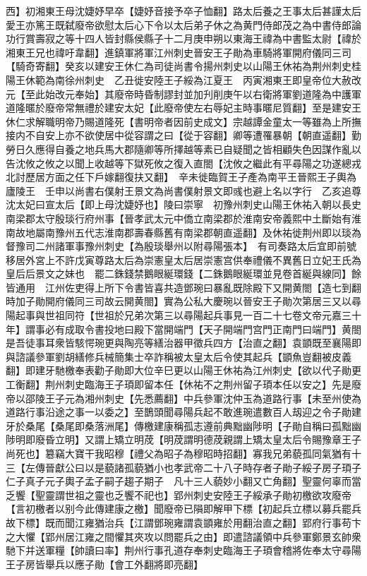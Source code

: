 西】初湘東王母沈婕妤早卒【婕妤音接予卒子恤翻】路太后養之王事太后甚謹太后愛王亦篤王既弑廢帝欲慰太后心下令以太后弟子休之為黄門侍郎茂之為中書侍郎論功行賞壽寂之等十四人皆封縣侯縣子十二月庚申朔以東海王禕為中書監太尉【禕於湘東王兄也禕吁韋翻】進鎮軍將軍江州刺史晉安王子勛為車騎將軍開府儀同三司【騎奇寄翻】癸亥以建安王休仁為司徒尚書令揚州刺史以山陽王休祐為荆州刺史桂陽王休範為南徐州刺史　乙丑徙安陸王子綏為江夏王　丙寅湘東王即皇帝位大赦改元【至此始改元奉始】其廢帝時昏制謬封並加刋削庚午以右衛將軍劉道隆為中護軍道隆暱於廢帝常無禮於建安太妃【此廢帝使左右辱妃主時事暱尼質翻】至是建安王休仁求解職明帝乃賜道隆死【書明帝者因前史成文】宗越譚金童太一等雖為上所撫接内不自安上亦不欲使居中從容謂之曰【從于容翻】卿等遭罹暴朝【朝直遥翻】勤勞日久應得自養之地兵馬大郡隨卿等所擇越等素已自疑聞之皆相顧失色因謀作亂以告沈攸之攸之以聞上收越等下獄死攸之復入直閤【沈攸之繼此有平尋陽之功遂總戎北討歷居方面之任下戶嫁翻復扶又翻】　辛未徙臨賀王子產為南平王晉熙王子輿為廬陵王　壬申以尚書右僕射王景文為尚書僕射景文即彧也避上名以字行　乙亥追尊沈太妃曰宣太后【即上母沈婕妤也】陵曰崇寧　初豫州刺史山陽王休祐入朝以長史南梁郡太守殷琰行府州事【晉孝武太元中僑立南梁郡於淮南安帝義熙中土斷始有淮南故地屬南豫州五代志淮南郡壽春縣舊有南梁郡朝直遥翻】及休祐徙荆州即以琰為督豫司二州諸軍事豫州刺史【為殷琰舉州以附尋陽張本】　有司奏路太后宜即前號移居外宮上不許戊寅尊路太后為崇憲皇太后居崇憲宫供奉禮儀不異舊日立妃王氏為皇后后景文之妹也　罷二銖錢禁鵝眼綖環錢【二銖鵝眼綖環並見卷首綖與線同】餘皆通用　江州佐吏得上所下令書皆喜共造鄧琬曰暴亂既除殿下又開黄閤【造七到翻時加子勛開府儀同三司故云開黄閤】實為公私大慶琬以晉安王子勛次第居三又以尋陽起事與世祖同符【世祖於兄弟次第三以尋陽起兵事見一百二十七卷文帝元嘉三十年】謂事必有成取令書投地曰殿下當開端門【天子開端門宫門正南門曰端門】黄閤是吾徒事耳衆皆駭愕琬更與陶亮等繕治器甲徵兵四方【治直之翻】袁顗既至襄陽即與諮議參軍劉胡繕修兵械簡集士卒詐稱被太皇太后令使其起兵【顗魚豈翻被皮義翻】即建牙馳檄奉表勸子勛即大位辛巳更以山陽王休祐為江州刺史【欲以代子勛更工衡翻】荆州刺史臨海王子頊即留本任【休祐不之荆州留子頊本任以安之】先是廢帝以邵陵王子元為湘州刺史【先悉薦翻】中兵參軍沈仲玉為道路行事【未至州使為道路行事沿途之事一以委之】至鵲頭聞尋陽兵起不敢進琬遣數百人刼迎之令子勛建牙於桑尾【桑尾即桑落洲尾】傳檄建康稱孤志遵前典黜幽陟明【子勛自稱曰孤黜幽陟明即廢昏立明】又謂上矯立明荗【明荗謂明德荗親謂上矯太皇太后令賜豫章王子尚死也】簒竊大寶干我昭穆【禮父為昭子為穆昭時招翻】寡我兄弟藐孤同氣猶有十三【左傳晉獻公曰以是藐諸孤藐猶小也孝武帝二十八子時存者子勛子綏子房子頊子仁子真子元子輿子孟子嗣子趨子期子　凡十三人藐妙小翻又亡角翻】聖靈何辜而當乏饗【聖靈謂世祖之靈也乏饗不祀也】郢州刺史安陸王子綏承子勛初檄欲攻廢帝【言初檄者以别今此傳建康之檄】聞廢帝已隕即解甲下標【初起兵立標以募兵罷兵故下標】既而聞江雍猶治兵【江謂鄧琬雍謂袁顗雍於用翻治直之翻】郢府行事苟卞之大懼【郢州居江雍之間懼其夾攻以問罷兵之由】即遣諮議領中兵參軍鄭景玄帥衆馳下并送軍糧【帥讀曰率】荆州行事孔道存奉刺史臨海王子頊會稽將佐奉太守尋陽王子房皆舉兵以應子勛【會工外翻將即亮翻】

